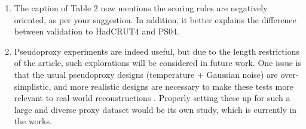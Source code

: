 \documentclass[11pt]{article}
\newcommand{\bl}[1]{\color{red}\textbf{[Bo: #1]}\normalcolor}
\newcommand{\jeg}[1]{\color{blue}\textbf{Julien: #1]}\normalcolor}
\begin{document}
\begin{itemize}
\begin{enumerate}

\item The caption of Table 2 now mentions the scoring rules
are negatively oriented, as per your suggestion. In addition, it better explains the difference between validation to HadCRUT4 and PS04. 

\item Pseudoproxy experiments are indeed useful, but due to the length restrictions of the article, such explorations will be considered in future work. One issue is that the usual pseudoproxy designs (temperature + Gaussian noise) are over-simplistic, and more realistic designs are necessary to make these tests more relevant to real-world reconstructions \citep{Evans_grl2014}. Properly setting these up for such a large and diverse proxy dataset would be its own study, which is currently in the works. 

\end{enumerate}



 





\end{itemize}
\end{document}
